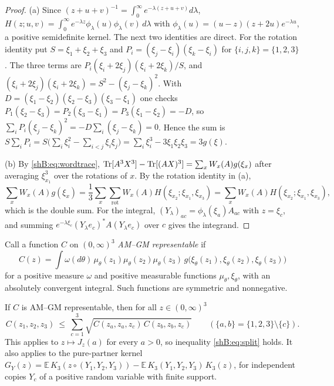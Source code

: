\begin{proof}
(a) Since $(z+u+v)^{-1}=\int_0^\infty e^{-\lambda(z+u+v)}d\lambda$, $H(z;u,v)=\int_0^\infty e^{-\lambda z}\phi_\lambda(u)\phi_\lambda(v)\,d\lambda$ with $\phi_\lambda(u)=(u-z)(z+2u)e^{-\lambda u}$, a positive semidefinite kernel. The next two identities are direct. For the rotation identity put $S=\xi_1+\xi_2+\xi_3$ and $P_i=(\xi_j-\xi_i)(\xi_k-\xi_i)$ for $\{i,j,k\}=\{1,2,3\}$. The three terms are $P_i(\xi_i+2\xi_j)(\xi_i+2\xi_k)/S$, and $(\xi_i+2\xi_j)(\xi_i+2\xi_k)=S^2-(\xi_j-\xi_k)^2$. With $D=(\xi_1-\xi_2)(\xi_2-\xi_3)(\xi_3-\xi_1)$ one checks $P_1(\xi_2-\xi_3)=P_2(\xi_3-\xi_1)=P_3(\xi_1-\xi_2)=-D$, so $\sum_iP_i(\xi_j-\xi_k)^2=-D\sum_i(\xi_j-\xi_k)=0$. Hence the sum is $S\sum_iP_i=S\big(\sum_i\xi_i^2-\sum_{i<j}\xi_i\xi_j\big)=\sum_i\xi_i^3-3\xi_1\xi_2\xi_3=3g(\xi)$.

(b) By \eqref{shB:eq:wordtrace}, $\operatorname{Tr}[A^3X^3]-\operatorname{Tr}[(AX)^3]=\sum_xW_x(A)g(\xi_x)$ after averaging $\xi_{x_1}^3$ over the rotations of $x$. By the rotation identity in (a),
\[
\sum_xW_x(A)g(\xi_x)=\frac13\sum_x\sum_{\mathrm{rot}}W_x(A)H(\xi_{x_2};\xi_{x_1},\xi_{x_3})=\sum_xW_x(A)H(\xi_{x_2};\xi_{x_1},\xi_{x_3}),
\]
which is the double sum. For the integral, $(Y_\lambda)_{ac}=\phi_\lambda(\xi_a)A_{ac}$ with $z=\xi_c$, and summing $e^{-\lambda\xi_c}(Y_\lambda e_c)^*A(Y_\lambda e_c)$ over $c$ gives the integrand.
\end{proof}

Call a function $C$ on $(0,\infty)^3$ \emph{AM--GM representable} if
\[
C(z)=\int\omega(d\theta)\,\mu_\theta(z_1)\mu_\theta(z_2)\mu_\theta(z_3)\,g\big(\xi_\theta(z_1),\xi_\theta(z_2),\xi_\theta(z_3)\big)
\]
for a positive measure $\omega$ and positive measurable functions $\mu_\theta,\xi_\theta$, with an absolutely convergent integral. Such functions are symmetric and nonnegative.

\begin{corollary}\label{shB:cor:split}
If $C$ is AM--GM representable, then for all $z\in(0,\infty)^3$
\[
C(z_1,z_2,z_3)\ \le\ \sum_{c=1}^3\sqrt{C(z_a,z_a,z_c)\,C(z_b,z_b,z_c)}\qquad(\{a,b\}=\{1,2,3\}\setminus\{c\}).
\]
This applies to $z\mapsto J_z(a)$ for every $a>0$, so inequality \eqref{shB:eq:split} holds. It also applies to the pure-partner kernel $G_Y(z)=\mathbb E\,K_3(z\circ(Y_1,Y_2,Y_3))-\mathbb E\,K_3(Y_1,Y_2,Y_3)\,K_3(z)$, for independent copies $Y_c$ of a positive random variable with finite support.
\end{corollary}

